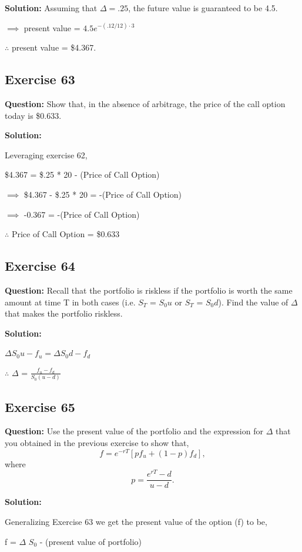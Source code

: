 \documentclass{article}
\begin{document}
\textbf{Solution:}
Assuming that $\Delta = .25$, the future value is guaranteed to be 4.5.

$\implies$ present value = $4.5e^{-(.12/12) \cdot 3}$

$\therefore$ present value = \$4.367.

\subsection*{Exercise 63}
\textbf{Question:} Show that, in the absence of arbitrage, the price of the call option today is \$0.633.

\textbf{Solution:}

Leveraging exercise 62,

\$4.367 = \$.25 * 20 - (Price of Call Option)

$\implies$ \$4.367 - \$.25 * 20  = -(Price of Call Option)

$\implies$ -0.367 = -(Price of Call Option)

$\therefore$ Price of Call Option = \$0.633


\subsection*{Exercise 64}
\textbf{Question:} Recall that the portfolio is riskless if the portfolio is worth the same amount at time T in both
cases (i.e. $S_T$ = $S_{0}u$ or $S_T$ = $S_{0}d$). Find the value of $\Delta$ that makes the portfolio riskless.

\textbf{Solution:}

$\Delta S_{0}u - f_u = \Delta S_{0}d - f_d$

$\therefore$ $\Delta$ = $\frac{f_u - f_d}{S_0(u - d)}$

\subsection*{Exercise 65}
\textbf{Question:} Use the present value of the portfolio and the expression for $\Delta$ that you obtained in the previous exercise to show that, $$f=e^{-rT}\left[pf_u+(1-p)f_d\right],$$ where $$p=\frac{e^{rT}-d}{u-d}.$$

\textbf{Solution:}

Generalizing Exercise 63 we get the present value of the option (f) to be,

\vspace{\baselineskip}

f = $\Delta$ $S_0$ - (present value of portfolio)
\end{document}
